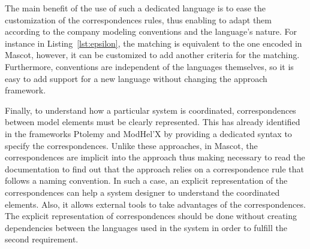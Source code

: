 The main benefit of the use of such a dedicated language is to ease the customization of the correspondences rules, thus enabling to adapt them according to the company modeling conventions and the language's nature. For instance in Listing~\ref{lst:epsilon}, the matching is equivalent to the one encoded in Mascot, however, it can be customized to add another criteria for the matching. Furthermore, conventions are independent of the languages themselves, so it is easy to add support for a new language without changing the approach framework.


Finally, to understand how a particular system is coordinated, correspondences between model elements must be clearly represented. This has already identified in the frameworks Ptolemy and ModHel'X by providing a dedicated syntax to specify the correspondences. Unlike these approaches, in Mascot, the correspondences are implicit into the approach thus making necessary to read the documentation to find out that the approach relies on a correspondence rule that follows a naming convention. In such a case, an explicit representation of the correspondences can help a system designer to understand the coordinated elements. Also, it allows external tools to take advantages of the correspondences. The explicit representation of correspondences should be done without creating dependencies between the languages used in the system in order to fulfill the second requirement.%
	
	
	
	
	
